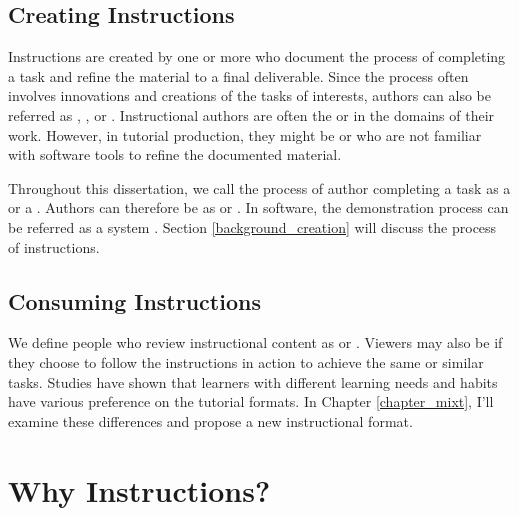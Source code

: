 
\subsection{Creating Instructions}
Instructions are created by one or more  who document the process of completing a task and refine the material to a final deliverable.
%
Since the process often involves innovations and creations of the tasks of interests, authors can also be referred as , , or .
%
Instructional authors are often the  or  in the domains of their work. However, in tutorial production, they might be  or  who are not familiar with software tools to refine the documented material.

Throughout this dissertation, we call the process of author completing a task as a  or a . Authors can therefore be as  or .
%
In software, the demonstration process can be referred as a system . Section \ref{background_creation} will discuss the  process of instructions.


\subsection{Consuming Instructions}
We define people who review instructional content as  or . Viewers may also be  if they choose to follow the instructions in action to achieve the same or similar tasks.
%
Studies have shown that learners with different learning needs and habits have various preference on the tutorial formats. In Chapter \ref{chapter_mixt}, I'll examine these differences and propose a new instructional format.



\section{Why Instructions?}
\label{background_why}

